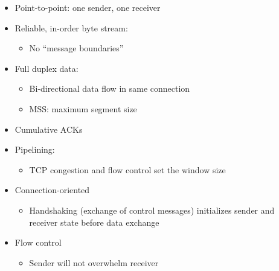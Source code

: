 \begin{itemize}
    \begin{itemize}

      \item Point-to-point: one sender, one receiver

      \item Reliable, in-order byte stream:

        \begin{itemize}

          \item No ``message boundaries''

        \end{itemize}

      \item Full duplex data:

        \begin{itemize}

          \item Bi-directional data flow in same connection

          \item MSS: maximum segment size

        \end{itemize}

      \item Cumulative ACKs

      \item Pipelining:

        \begin{itemize}

          \item TCP congestion and flow control set the window size

        \end{itemize}

      \item Connection-oriented

        \begin{itemize}

          \item Handshaking (exchange of control messages) initializes sender and receiver state before data exchange

        \end{itemize}

      \item Flow control

        \begin{itemize}

          \item Sender will not overwhelm receiver


\end{itemize}
\end{itemize}
\end{itemize}
